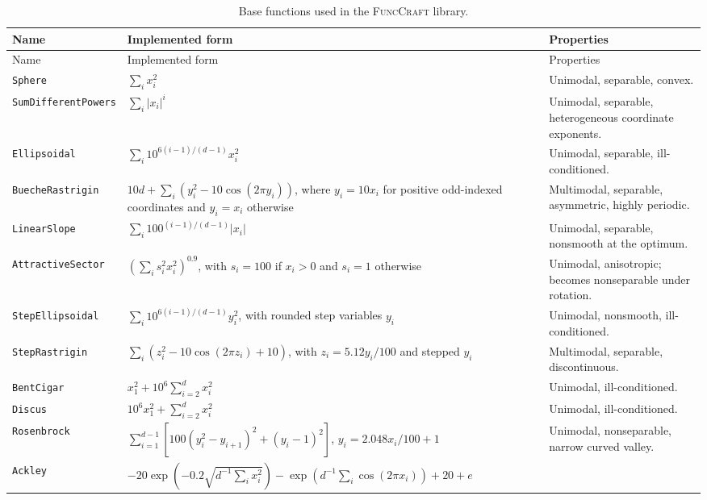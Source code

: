 \documentclass[journal]{IEEEtran}
\theoremstyle{remark}
\theoremstyle{plain}
\begin{document}
\begingroup
\scriptsize
\setlength{\tabcolsep}{3pt}
\renewcommand{\arraystretch}{1.18}
\begin{longtable}{@{}p{}p{}p{}@{}}
	\caption{Base functions used in the \textsc{FuncCraft} library.}
	\label{tab:base-function-library}\\
	\hline
	Name & Implemented form & Properties \\
	\hline
	\endfirsthead
	\hline
	Name & Implemented form & Properties \\
	\hline
	\endhead
	\hline
	\endfoot
	\texttt{Sphere} &
	\(\sum_i x_i^2\) &
	Unimodal, separable, convex. \\
	\texttt{SumDifferentPowers} &
	\(\sum_i |x_i|^{i}\) &
	Unimodal, separable, heterogeneous coordinate exponents. \\
	\texttt{Ellipsoidal} &
	\(\sum_i 10^{6(i-1)/(d-1)}x_i^2\) &
	Unimodal, separable, ill-conditioned. \\
	\texttt{BuecheRastrigin} &
	\(10d+\sum_i (y_i^2-10\cos(2\pi y_i))\), where
	\(y_i=10x_i\) for positive odd-indexed coordinates and \(y_i=x_i\)
	otherwise &
	Multimodal, separable, asymmetric, highly periodic. \\
	\texttt{LinearSlope} &
	\(\sum_i 100^{(i-1)/(d-1)}|x_i|\) &
	Unimodal, separable, nonsmooth at the optimum. \\
	\texttt{AttractiveSector} &
	\(\left(\sum_i s_i^2x_i^2\right)^{0.9}\), with
	\(s_i=100\) if \(x_i>0\) and \(s_i=1\) otherwise &
	Unimodal, anisotropic; becomes nonseparable under rotation. \\
	\texttt{StepEllipsoidal} &
	\(\sum_i 10^{6(i-1)/(d-1)}y_i^2\), with rounded step variables \(y_i\) &
	Unimodal, nonsmooth, ill-conditioned. \\
	\texttt{StepRastrigin} &
	\(\sum_i (z_i^2-10\cos(2\pi z_i)+10)\), with
	\(z_i=5.12y_i/100\) and stepped \(y_i\) &
	Multimodal, separable, discontinuous. \\
	\texttt{BentCigar} &
	\(x_1^2+10^6\sum_{i=2}^d x_i^2\) &
	Unimodal, ill-conditioned. \\
	\texttt{Discus} &
	\(10^6x_1^2+\sum_{i=2}^d x_i^2\) &
	Unimodal, ill-conditioned. \\
	\texttt{Rosenbrock} &
	\(\sum_{i=1}^{d-1}\left[100(y_i^2-y_{i+1})^2+(y_i-1)^2\right]\),
	\(y_i=2.048x_i/100+1\) &
	Unimodal, nonseparable, narrow curved valley. \\
	\texttt{Ackley} &
	\(-20\exp\!\left(-0.2\sqrt{d^{-1}\sum_i x_i^2}\right)
	-\exp\!\left(d^{-1}\sum_i\cos(2\pi x_i)\right)+20+e\) &

\end{longtable}
\end{document}
